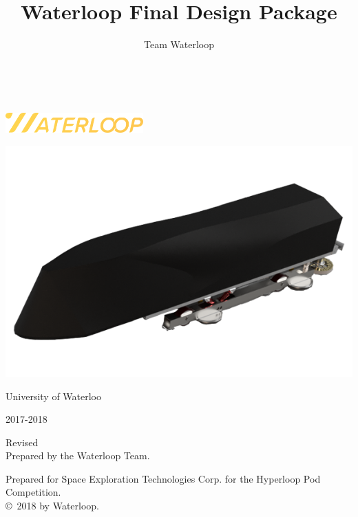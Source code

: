\documentclass[hidelinks, twoside]{report}
\author{Team Waterloop}
\title{Waterloop Final Design Package}
\date{\displaydate{date}}
\begin{document}
    \thispagestyle{empty}

    {%
    \centering
    \Large

    ~\vspace{\fill}

    \vspace{2.5cm}

    \includegraphics[width=200px]{images/waterloop_logo.png}

    \includegraphics[width=\textwidth]{images/assembled_goose.png}

    \vspace{3.5cm}
    University of Waterloo

    \vspace{\fill}

    2017-2018

    }%
    \clearpage

    Revised \\

    Prepared by the Waterloop Team.

    Prepared for Space Exploration Technologies Corp. for the Hyperloop Pod Competition.\\

    \copyright \ 2018 by Waterloop.
\end{document}
